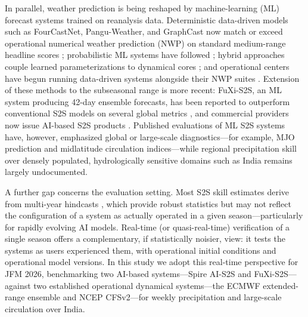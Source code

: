 \documentclass[11pt,a4paper]{article}
\begin{document}
In parallel, weather prediction is being reshaped by machine-learning
(ML) forecast systems trained on reanalysis data. Deterministic
data-driven models such as FourCastNet, Pangu-Weather, and GraphCast
now match or exceed operational numerical weather prediction (NWP) on
standard medium-range headline scores
\citep{pathak2022,bi2023,lam2023,benbouallegue2024,rasp2024};
probabilistic ML systems have followed \citep{price2025}; hybrid
approaches couple learned parameterizations to dynamical cores
\citep{kochkov2024}; and operational centers have begun running
data-driven systems alongside their NWP suites \citep{lang2024}.
Extension of these methods to the subseasonal range is more recent:
FuXi-S2S, an ML system producing 42-day ensemble forecasts, has been
reported to outperform conventional S2S models on several global
metrics \citep{chen2024}, and commercial providers now issue AI-based
S2S products \citep{spire2026}. Published evaluations of ML S2S
systems have, however, emphasized global or large-scale
diagnostics---for example, MJO prediction and midlatitude circulation
indices---while regional precipitation skill over densely populated,
hydrologically sensitive domains such as India remains largely
undocumented.

A further gap concerns the evaluation setting. Most S2S skill
estimates derive from multi-year hindcasts
\citep{deandrade2019,pegion2019}, which provide robust statistics but
may not reflect the configuration of a system as actually operated in a
given season---particularly for rapidly evolving AI models. Real-time
(or quasi-real-time) verification of a single season offers a
complementary, if statistically noisier, view: it tests the systems as
users experienced them, with operational initial conditions and
operational model versions. In this study we adopt this real-time
perspective for JFM 2026, benchmarking two AI-based systems---Spire
AI-S2S and FuXi-S2S---against two established operational dynamical
systems---the ECMWF extended-range ensemble and NCEP CFSv2---for weekly
precipitation and large-scale circulation over India.
\end{document}
